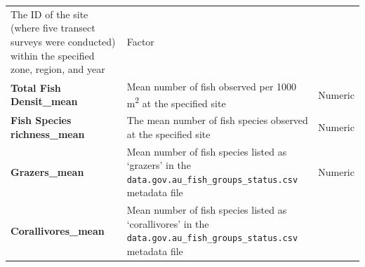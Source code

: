 \documentclass[12pt,]{article}
\begin{document}
\begin{longtable}[]{@{}lll@{}}
\begin{minipage}[t]{0.32\columnwidth}
The ID of the site (where five transect surveys were conducted) within
the specified zone, region, and year\strut
\end{minipage} & \begin{minipage}[t]{0.15\columnwidth}\raggedright
Factor\strut
\end{minipage}\tabularnewline
\begin{minipage}[t]{0.44\columnwidth}\raggedright
\textbf{Total Fish Densit\_mean}\strut
\end{minipage} & \begin{minipage}[t]{0.32\columnwidth}\raggedright
Mean number of fish observed per 1000 m\textsuperscript{2} at the
specified site\strut
\end{minipage} & \begin{minipage}[t]{0.15\columnwidth}\raggedright
Numeric\strut
\end{minipage}\tabularnewline
\begin{minipage}[t]{0.44\columnwidth}\raggedright
\textbf{Fish Species richness\_mean}\strut
\end{minipage} & \begin{minipage}[t]{0.32\columnwidth}\raggedright
The mean number of fish species observed at the specified site\strut
\end{minipage} & \begin{minipage}[t]{0.15\columnwidth}\raggedright
Numeric\strut
\end{minipage}\tabularnewline
\begin{minipage}[t]{0.44\columnwidth}\raggedright
\textbf{Grazers\_mean}\strut
\end{minipage} & \begin{minipage}[t]{0.32\columnwidth}\raggedright
Mean number of fish species listed as `grazers' in the
\texttt{data.gov.au\_fish\_groups\_status.csv} metadata file\strut
\end{minipage} & \begin{minipage}[t]{0.15\columnwidth}\raggedright
Numeric\strut
\end{minipage}\tabularnewline
\begin{minipage}[t]{0.44\columnwidth}\raggedright
\textbf{Corallivores\_mean}\strut
\end{minipage} & \begin{minipage}[t]{0.32\columnwidth}\raggedright
Mean number of fish species listed as `corallivores' in the
\texttt{data.gov.au\_fish\_groups\_status.csv} metadata file\strut
\end{minipage} & \begin{minipage}[t]{0.15\columnwidth}\raggedright

\end{minipage}
\end{longtable}
\end{document}
